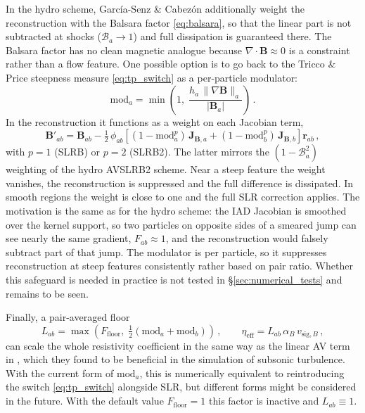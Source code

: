 In the hydro scheme, García-Senz \& Cabezón additionally weight the reconstruction with the Balsara factor \eqref{eq:balsara}, so that the linear part is not subtracted at shocks ($\mathcal{B}_a \to 1$) and full dissipation is guaranteed there. The Balsara factor has no clean magnetic analogue because $\nabla\cdot\mathbf{B} \approx 0$ is a constraint rather than a flow feature. One possible option is to go back to the Tricco \& Price steepness measure \eqref{eq:tp_switch} as a per-particle modulator:
\begin{equation}
    \mathrm{mod}_a = \min\!\left(1,\; \frac{h_a\, \|\nabla \mathbf{B}\|_a}{|\mathbf{B}_a|}\right)\, .
    \label{eq:slr_modulator}
\end{equation}
In the reconstruction it functions as a weight on each Jacobian term,
\begin{equation}
    \mathbf{B}'_{ab} = \mathbf{B}_{ab} - \tfrac{1}{2}\,\phi_{ab}\left[(1 - \mathrm{mod}_a^p)\,\mathbf{J}_{\mathbf{B},a} + (1 - \mathrm{mod}_b^p)\,\mathbf{J}_{\mathbf{B},b}\right]\mathbf{r}_{ab}\,,
    \label{eq:slr_B_mod}
\end{equation}
with $p = 1$ (SLRB) or $p = 2$ (SLRB2). The latter mirrors the $(1 - \mathcal{B}_a^2)$ weighting of the hydro AVSLRB2 scheme. Near a steep feature the weight vanishes, the reconstruction is suppressed and the full difference is dissipated. In smooth regions the weight is close to one and the full SLR correction applies. The motivation is the same as for the hydro scheme: the IAD Jacobian is smoothed over the kernel support, so two particles on opposite sides of a smeared jump can see nearly the same gradient, $F_{ab} \approx 1$, and the reconstruction would falsely subtract part of that jump. The modulator is per particle, so it suppresses reconstruction at steep features consistently rather based on pair ratio. Whether this safeguard is needed in practice is not tested in §\ref{sec:numerical_tests} and remains to be seen.

Finally, a pair-averaged floor
\begin{equation}
    L_{ab} = \max\!\left(F_\mathrm{floor},\; \tfrac{1}{2}(\mathrm{mod}_a + \mathrm{mod}_b)\right)\,, \qquad
    \eta_\mathrm{eff} = L_{ab}\, \alpha_B\, v_{\mathrm{sig},B}\,,
    \label{eq:Lij}
\end{equation}
can scale the whole resistivity coefficient in the same way as the linear AV term in \cite{GarciaSenzCabezon2026}, which they found to be beneficial in the simulation of subsonic turbulence. With the current form of $\mathrm{mod}_a$, this is numerically equivalent to reintroducing the switch \eqref{eq:tp_switch} alongside SLR, but different forms might be considered in the future. With the default value $F_\mathrm{floor} = 1$ this factor is inactive and $L_{ab} \equiv 1$. 

